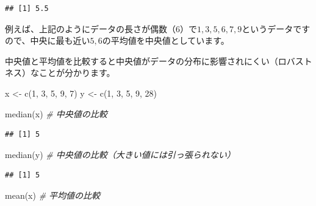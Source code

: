 \documentclass[
  12pt,
]{book}
\newenvironment{Shaded}{\begin{snugshade}}{\end{snugshade}}
\newcommand{\CommentTok}[1]{\textcolor[rgb]{0.56,0.35,0.01}{\textit{#1}}}
\newcommand{\DecValTok}[1]{\textcolor[rgb]{0.00,0.00,0.81}{#1}}
\newcommand{\FunctionTok}[1]{\textcolor[rgb]{0.00,0.00,0.00}{#1}}
\newcommand{\NormalTok}[1]{#1}
\newcommand{\OtherTok}[1]{\textcolor[rgb]{0.56,0.35,0.01}{#1}}
\begin{document}
\begin{verbatim}
## [1] 5.5
\end{verbatim}

例えば、上記のようにデータの長さが偶数（\(6\)）で\(1, 3, 5, 6, 7, 9\)というデータですので、中央に最も近い\(5, 6\)の平均値を中央値としています。

中央値と平均値を比較すると中央値がデータの分布に影響されにくい（ロバストネス）なことが分かります。

\begin{Shaded}
\begin{Highlighting}[numbers=left,,]
\NormalTok{x }\OtherTok{\textless{}{-}} \FunctionTok{c}\NormalTok{(}\DecValTok{1}\NormalTok{, }\DecValTok{3}\NormalTok{, }\DecValTok{5}\NormalTok{, }\DecValTok{9}\NormalTok{, }\DecValTok{7}\NormalTok{)}
\NormalTok{y }\OtherTok{\textless{}{-}} \FunctionTok{c}\NormalTok{(}\DecValTok{1}\NormalTok{, }\DecValTok{3}\NormalTok{, }\DecValTok{5}\NormalTok{, }\DecValTok{9}\NormalTok{, }\DecValTok{28}\NormalTok{)}
\end{Highlighting}
\end{Shaded}

\begin{Shaded}
\begin{Highlighting}[numbers=left,,]
\FunctionTok{median}\NormalTok{(x)                    }\CommentTok{\# 中央値の比較}
\end{Highlighting}
\end{Shaded}

\begin{verbatim}
## [1] 5
\end{verbatim}

\begin{Shaded}
\begin{Highlighting}[numbers=left,,]
\FunctionTok{median}\NormalTok{(y)                    }\CommentTok{\# 中央値の比較（大きい値には引っ張られない）}
\end{Highlighting}
\end{Shaded}

\begin{verbatim}
## [1] 5
\end{verbatim}

\begin{Shaded}
\begin{Highlighting}[numbers=left,,]
\FunctionTok{mean}\NormalTok{(x)                      }\CommentTok{\# 平均値の比較}
\end{Highlighting}
\end{Shaded}
\end{document}
